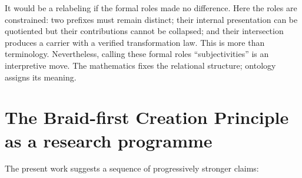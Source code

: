 \documentclass[11pt]{article}
\theoremstyle{definition}
\theoremstyle{remark}
\begin{document}
It would be a relabeling if the formal roles made no difference. Here the roles are constrained: two prefixes must remain distinct; their internal presentation can be quotiented but their contributions cannot be collapsed; and their intersection produces a carrier with a verified transformation law. This is more than terminology. Nevertheless, calling these formal roles ``subjectivities'' is an interpretive move. The mathematics fixes the relational structure; ontology assigns its meaning.

\section{The Braid-first Creation Principle as a research programme}

The present work suggests a sequence of progressively stronger claims:
\end{document}
